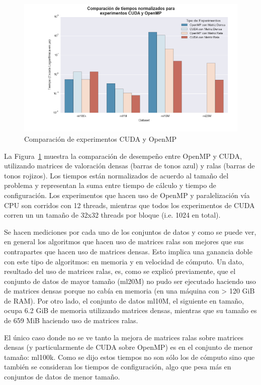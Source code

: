 \documentclass[11pt, a4paper]{article}
\begin{document}
  \begin{figure}[ht]
    \centering
    \includegraphics[width=\textwidth]{plots/cuda_omp.png}
      \caption{Comparación de experimentos CUDA y OpenMP}\label{fig:bar:cuda:omp}
  \end{figure}

  La Figura~\ref{fig:bar:cuda:omp} muestra la comparación de desempeño entre
  OpenMP y CUDA, utilizando matrices de valoración densas (barras de tonos
  azul) y ralas (barras de tonos rojizos). Los tiempos están normalizados de
  acuerdo al tamaño del problema y representan la suma entre tiempo de cálculo
  y tiempo de configuración. Los experimentos que hacen uso de OpenMP y
  paralelización vía CPU son corridos con 12 threads, mientras que todos los
  experimentos de CUDA corren un un tamaño de 32x32 threads por bloque (i.e.
  1024 en total).

  Se hacen mediciones por cada uno de los conjuntos de datos y como se puede
  ver, en general los algoritmos que hacen uso de matrices ralas son mejores
  que sus contrapartes que hacen uso de matrices densas. Esto implica una
  ganancia doble con este tipo de algoritmos: en memoria y en velocidad de
  cómputo. Un dato, resultado del uso de matrices ralas, es, como se explicó
  previamente, que el conjunto de datos de mayor tamaño (ml20M) no pudo ser
  ejecutado haciendo uso de matrices densas porque no cabía en memoria (en una
  máquina con > 120 GiB de RAM). Por otro lado, el conjunto de datos ml10M, el
  siguiente en tamaño, ocupa 6.2 GiB de memoria utilizando matrices densas,
  mientras que su tamaño es de 659 MiB haciendo uso de matrices ralas.

  El único caso donde no se ve tanto la mejora de matrices ralas sobre matrices
  densas (y particularmente de CUDA sobre OpenMP) es en el conjunto de menor
  tamaño: ml100k. Como se dijo estos tiempos no son sólo los de cómputo sino
  que también se consideran los tiempos de configuración, algo que pesa más en
  conjuntos de datos de menor tamaño.
\end{document}
